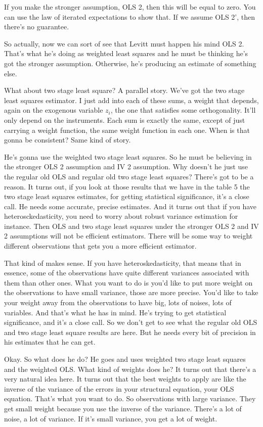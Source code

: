 \documentclass[11pt,a4paper]{amsart}
\theoremstyle{plain}
\theoremstyle{definition}
\begin{document}
			   If you make the stronger assumption, OLS 2, then this will be equal to zero. You can use the law of iterated expectations to show that. If we assume OLS 2', then there's no guarantee. \par 
			   So actually, now we can sort of see that Levitt must happen his mind OLS 2. That's what he's doing as weighted least squares and he must be thinking he's got the stronger assumption. Otherwise, he's producing an estimate of something else. \par
				What about two stage least square? A parallel story. We've got the two stage least squares estimator. I just add into each of these sums, a weight that depends, again on the exogenous variable $z_{i}$, the one that satisfies some orthogonality. It'll only depend on the instruments. Each sum is exactly the same, except of just carrying a weight function, the same weight function in each one.  When is that gonna be consistent? Same kind of story. \par 
				He's gonna use the weighted two stage least squares. So he must be believing in the stronger OLS 2 assumption and IV 2 assumption. Why doesn't he just use the regular old OLS and regular old two stage least squares? There's got to be a reason. It turns out, if you look at those results that we have in the table 5 the two stage least squares estimates, for getting statistical significance, it's a close call. He needs some accurate, precise estimates. And it turns out that if you have heterosckedasticity, you need to worry about robust variance estimation for instance. Then OLS and two stage least squares under the stronger OLS 2 and IV 2 assumptions will not be efficient estimators. There will be some way to weight different observations that gets you a more efficient estimator. \par 
				That kind of makes sense. If you have heteroskedasticity, that means that in essence, some of the observations have quite different variances associated with them than other ones.  What you want to do is you'd like to put more weight on the observations to have small variance, those are more precise. You'd like to take your weight away from the observations to have big, lots of noises, lots of variables. And that's what he has in mind. He's trying to get statistical significance, and it's a close call. So we don't get to see what the regular old OLS and two stage least square results are here. But he needs every bit of precision in his estimates that he can get. \par 
				Okay. So what does he do? He goes and uses weighted two stage least squares and the weighted OLS. What kind of weights does he? It turns out that there's a very natural idea here.  It turns out that the best weights to apply are like the inverse of the variance of the errors in your structural equation, your OLS equation.  That's what you want to do. So observations with large variance. They get small weight because you use the inverse of the variance. There's a lot of noise, a lot of variance.  If it's small variance, you get a lot of weight. \par 
\end{document}

